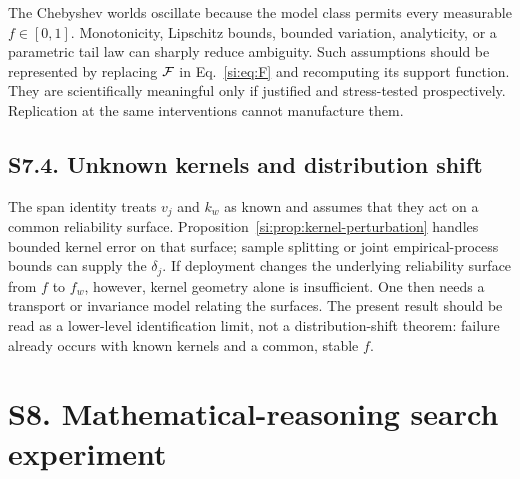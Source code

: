 The Chebyshev worlds oscillate because the model class permits every measurable $f\in[0,1]$. Monotonicity, Lipschitz bounds, bounded variation, analyticity, or a parametric tail law can sharply reduce ambiguity. Such assumptions should be represented by replacing $\mathcal F$ in Eq.~\ref{si:eq:F} and recomputing its support function. They are scientifically meaningful only if justified and stress-tested prospectively. Replication at the same interventions cannot manufacture them.

\subsection*{S7.4. Unknown kernels and distribution shift}

The span identity treats $v_j$ and $k_w$ as known and assumes that they act on a common reliability surface. Proposition~\ref{si:prop:kernel-perturbation} handles bounded kernel error on that surface; sample splitting or joint empirical-process bounds can supply the $\delta_j$. If deployment changes the underlying reliability surface from $f$ to $f_w$, however, kernel geometry alone is insufficient. One then needs a transport or invariance model relating the surfaces. The present result should be read as a lower-level identification limit, not a distribution-shift theorem: failure already occurs with known kernels and a common, stable $f$.

\section*{S8. Mathematical-reasoning search experiment}


